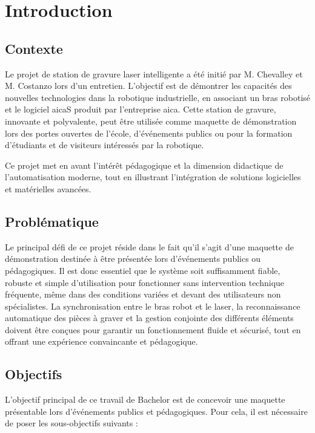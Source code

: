 \chapter{Introduction}
\label{chap:intro}


\section{Contexte}

Le projet de station de gravure laser intelligente a été initié par M. Chevalley et M. Costanzo lors d'un entretien. L'objectif est de démontrer les capacités des nouvelles technologies dans la robotique industrielle, en associant un bras robotisé et le logiciel \gls{aicaS}  produit par l'entreprise \gls{aica}. Cette station de gravure, innovante et polyvalente, peut être utilisée comme maquette de démonstration lors des portes ouvertes de l'école, d'événements publics ou pour la formation d'étudiants et de visiteurs intéressés par la robotique.

Ce projet met en avant l'intérêt pédagogique et la dimension didactique de l'automatisation moderne, tout en illustrant l'intégration de solutions logicielles et matérielles avancées.

\section{Problématique}

Le principal défi de ce projet réside dans le fait qu'il s'agit d'une maquette de démonstration destinée à être présentée lors d'événements publics ou pédagogiques. Il est donc essentiel que le système soit suffisamment fiable, robuste et simple d'utilisation pour fonctionner sans intervention technique fréquente, même dans des conditions variées et devant des utilisateurs non spécialistes. La synchronisation entre le bras robot et le laser, la reconnaissance automatique des pièces à graver et la gestion conjointe des différents éléments doivent être conçues pour garantir un fonctionnement fluide et sécurisé, tout en offrant une expérience convaincante et pédagogique.


\section{Objectifs}

L'objectif principal de ce travail de Bachelor est de concevoir une maquette présentable lors d'événements publics et pédagogiques. Pour cela, il est nécessaire de poser les sous-objectifs suivants :

